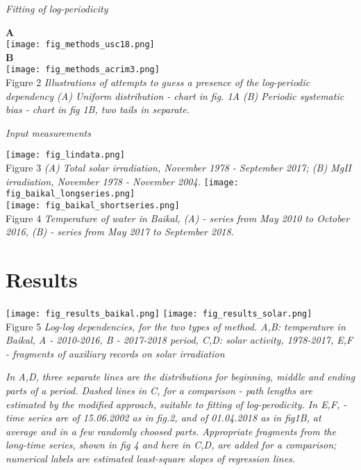 \documentclass[a4paper]{article}
\begin{document}
\textit{Fitting of log-periodicity}

\noindent
{\large{\textbf{A}}}\\
\texttt{[image: fig\_methods\_usc18.png]}\\
\vskip 12pt
\noindent
{\large{\textbf{B}}}\\
\texttt{[image: fig\_methods\_acrim3.png]}\\
\vskip 12pt
Figure 2 \textit{Illustrations of attempts to guess a presence of the log-periodic dependency (A) Uniform distribution - chart in fig. 1A (B) Periodic systematic bias - chart in fig 1B, two tails in separate.}
\vskip 12pt


\newpage

\textit{Input measurements}

\noindent
\texttt{[image: fig\_lindata.png]}\\
\vskip 12pt
Figure 3 \textit{(A) Total solar irradiation, November 1978 - September 2017; (B) MgII irradiation, November 1978 - November 2004.}
\vskip 12pt
\noindent
\texttt{[image: fig\_baikal\_longseries.png]}\\
\vskip 12pt
\noindent
\texttt{[image: fig\_baikal\_shortseries.png]}\\
\vskip 12pt
Figure 4 \textit{Temperature of water in Baikal, (A) - series from May 2010 to October 2016, (B) - series from May 2017 to September 2018.}

\section*{Results}

\texttt{[image: fig\_results\_baikal.png]}
\texttt{[image: fig\_results\_solar.png]}\\
Figure 5 \textit{Log-log dependencies, for the two types of method. A,B: temperature in Baikal, A - 2010-2016, B - 2017-2018 period, C,D: solar activity, 1978-2017, E,F - fragments of auxiliary records on solar irradiation}

\textit{\small{In A,D, three separate lines are the distributions for beginning, middle and ending parts of a period. Dashed lines in C, for a comparison - path lengths are estimated by the modified approach,  suitable to fitting of log-perodicity. In E,F, - time series are of 15.06.2002 as in fig.2, and of 01.04.2018 as in fig1B, at average and in a few randomly choosed parts. Appropriate fragments from the long-time series, shown in fig 4 and here in C,D, are added for a comparison; numerical labels are estimated least-square slopes of regression lines.}}
\end{document}
